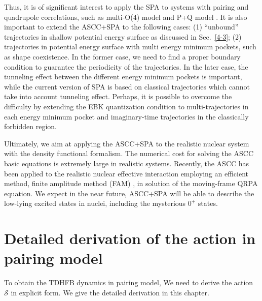 \documentclass[11pt]{book} %
\begin{document}
Thus, it is of significant interest to apply the SPA to systems with pairing and quadrupole correlations, such as multi-O(4) model \cite{HNMM07} and P+Q model \cite{HNMM08}. It is also important to extend the ASCC+SPA to the following cases: (1) ``unbound'' trajectories in shallow potential energy surface as discussed in Sec.~\ref{4-3}; (2) trajectories in potential energy surface with multi energy minimum pockets, such as shape coexistence.
In the former case, we need to find a proper boundary condition to guarantee the periodicity  of the trajectories. In the later case, the tunneling effect between the different energy minimum pockets is important, while the current version of SPA is based on classical trajectories which cannot take into account tunneling effect. Perhaps, it is possible to overcome the difficulty by extending the EBK quantization condition to multi-trajectories in each energy minimum pocket and imaginary-time trajectories in the classically forbidden region.

Ultimately, we aim at applying the ASCC+SPA to the realistic nuclear system with the density functional formalism. The numerical cost for solving the ASCC basic equations is extremely large in realistic systems. Recently, the ASCC has been applied to the realistic nuclear effective interaction \cite{WN16,WN17} employing an efficient method, finite amplitude method (FAM) \cite{NIY07,HKN13}, in solution of the moving-frame QRPA equation. We expect in the near future, ASCC+SPA will be able to describe the low-lying excited states in nuclei, including the mysterious $0^+$ states.



\clearpage{\pagestyle{empty}\cleardoublepage}
\appendix

\chapter{Detailed derivation of the action in pairing model}
\label{derivation}
To obtain the TDHFB dynamics in pairing model, We need to derive the action $\mathcal{S}$ in explicit form. We give the detailed derivation in this chapter.
\end{document}
